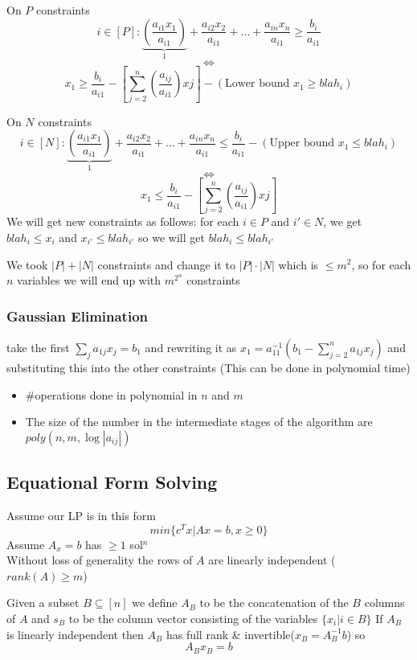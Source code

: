 \documentclass[12pt]{article}
\begin{document}
On $P$ constraints
$$i \in [P]: \underbrace{\left(\frac{a_{i1}x_1}{a_{i1}}\right)}_1 + \frac{a_{i2}x_2}{a_{i1}} + \dots + \frac{a_{in}x_n}{a_{i1}} \geq \frac{b_i}{a_{i1}}$$
$$\Longleftrightarrow$$
$$x_1 \geq \frac{b_i}{a_{i1}}-\left[\sum^n_{j=2}\left(\frac{a_{ij}}{a_{i1}}\right)xj\right]-(\text{Lower bound $x_1 \geq blah_i$})$$

On $N$ constraints
$$i \in [N]: \underbrace{\left(\frac{a_{i1}x_1}{a_{i1}}\right)}_1 + \frac{a_{i2}x_2}{a_{i1}} + \dots + \frac{a_{in}x_n}{a_{i1}} \leq \frac{b_i}{a_{i1}}-(\text{Upper bound $x_1 \leq blah_i$})$$
$$\Longleftrightarrow$$
$$x_1 \leq \frac{b_i}{a_{i1}}-\left[\sum^n_{j=2}\left(\frac{a_{ij}}{a_{i1}}\right)xj\right]$$
We will get new constraints as follows: for each $i\in P$ and $i' \in N$, we get $blah_i \leq x_i$ and $x_{i'} \leq blah_{i'}$ so we will get $blah_i \leq blah_{i'}$

We took $|P|+|N|$ constraints and change it to $|P|\cdot|N|$ which is $\leq m^2$, so for each $n$ variables we will end up with $m^{2^n}$ constraints
\subsubsection{Gaussian Elimination}
take the first $\sum_ja_{1j}x_j=b_1$ and rewriting it as $x_1 = a_{11}^{-1}(b_1-\sum_{j=2}^na_{1j}x_j)$ and substituting this into the other constraints (This can be done in polynomial time)
\begin{itemize}
	\item \#operations done in polynomial in $n$ and $m$
	\item The size of the number in the intermediate stages of the algorithm are $poly(n,m,\log|a_{ij}|)$
\end{itemize}

\subsection{Equational Form Solving}
Assume our LP is in this form 
$$min\{c^Tx|Ax=b,x\geq0\}$$
Assume $A_x=b$ has $\geq1$ sol$^n$\\
Without loss of generality the rows of $A$ are linearly independent ($rank(A) \geq m$)

Given a subset $B \subseteq [n]$ we define $A_B$ to be the concatenation of the $B$ columns of $A$ and $s_B$ to be the column vector consisting of the variables $\{x_i|i\in B\}$ If $A_B$ is linearly independent then $A_B$ has full rank \& invertible($x_B=A_B^{-1}b$) so
$$A_Bx_B=b$$
\end{document}
